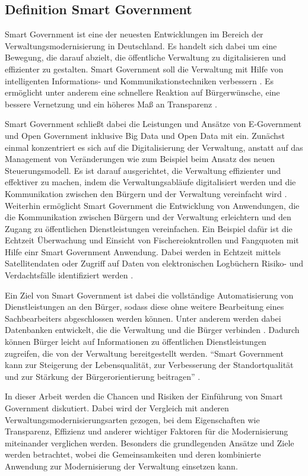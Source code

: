 \subsection{Definition Smart Government}
Smart Government ist eine der neuesten Entwicklungen im Bereich der Verwaltungsmodernisierung in Deutschland. 
Es handelt sich dabei um eine Bewegung, die darauf abzielt, die öffentliche Verwaltung zu digitalisieren und effizienter zu gestalten. 
Smart Government soll die Verwaltung mit Hilfe von intelligenten Informations- und Kommunikationstechniken verbessern \citep[][S.178]{von_Lucke_2016}.
Es ermöglicht unter anderem eine schnellere Reaktion auf Bürgerwünsche, eine bessere Vernetzung und ein höheres Maß an Transparenz \citep[Vgl][S.87]{Kersting2017}.
\par
Smart Government schließt dabei die Leistungen und Ansätze von E-Government und Open Government inklusive Big Data und Open Data mit ein.
Zunächst einmal konzentriert es sich auf die Digitalisierung der Verwaltung, anstatt auf das Management von Veränderungen wie zum Beispiel beim Ansatz des neuen Steuerungsmodell. 
Es ist darauf ausgerichtet, die Verwaltung effizienter und effektiver zu machen, indem die Verwaltungsabläufe digitalisiert werden und die Kommunikation zwischen den Bürgern und der Verwaltung vereinfacht wird \citep[Vgl.][]{von_Lucke_2016}.
Weiterhin ermöglicht Smart Government die Entwicklung von Anwendungen, die die Kommunikation zwischen Bürgern und der Verwaltung erleichtern und den Zugang zu öffentlichen Dienstleistungen vereinfachen. 
Ein Beispiel dafür ist die Echtzeit Überwachung und Einsicht von Fischereiokntrollen und Fangquoten mit Hilfe einr Smart Government Anwendung.
Dabei werden in Echtzeit mittels Satellitendaten oder Zugriff auf Daten von elektronischen Logbüchern Risiko- und Verdachtsfälle identifiziert werden \citep[][]{LandwirtschaftundErnaehrung2023}. 
\par
Ein Ziel von Smart Government ist dabei die vollständige Automatisierung von Dienstleistungen an den Bürger, sodass diese ohne weitere Bearbeitung eines Sachbearbeiters abgeschlossen werden können.
Unter anderem werden dabei Datenbanken entwickelt, die die Verwaltung und die Bürger verbinden \citep[Vgl.][]{von_Lucke_2016}. 
Dadurch können Bürger leicht auf Informationen zu öffentlichen Dienstleistungen zugreifen, die von der Verwaltung bereitgestellt werden.
``Smart Government kann zur Steigerung der Lebensqualität, zur Verbesserung der Standortqualität und zur Stärkung der Bürgerorientierung beitragen'' \citep[][]{von_Lucke_2016}. 
\par
In dieser Arbeit werden die Chancen und Risiken der Einführung von Smart Government diskutiert.
Dabei wird der Vergleich mit anderen Verwaltungsmodernisierungsarten gezogen, bei dem Eigenschaften wie Transparenz, Effizienz und anderer wichtiger Faktoren für die Modernisierung miteinander verglichen werden.
Besonders die grundlegenden Ansätze und Ziele werden betrachtet, wobei die Gemeinsamkeiten und deren kombinierte Anwendung zur Modernisierung der Verwaltung einsetzen kann.

